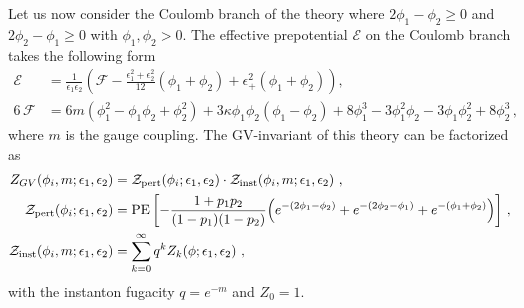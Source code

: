 Let us now consider the Coulomb branch of the theory where $2\phi_1-\phi_2 \ge0$ and $2\phi_2-\phi_1\ge0$ with $\phi_1,\phi_2>0$. The effective prepotential $\mathcal{E}$ on the Coulomb branch takes the following form
\begin{align}\label{eq:SU3_k_prepotential}
\mathcal{E} &= \frac{1}{\epsilon_1 \epsilon_2} 
\left( \mathcal{F} - \frac{\epsilon_1^2  + \epsilon_2^2}{12}(\phi_1 + \phi_2) +\epsilon_+^2 (\phi_1 + \phi_2) \right), \\ 
6\,\mathcal{F} &= 6 m(\phi_1^2 - \phi_1 \phi_2 + \phi_2^2)+ 3\kappa \phi_1 \phi_2(\phi_1 - \phi_2) + 8 \phi_1^3 - 3\phi_1^2 \phi_2 - 3\phi_1 \phi_2^2 + 8\phi_2^3\, ,\nonumber
\end{align}
where $m$ is the gauge coupling. The GV-invariant of this theory can be factorized as
\begin{align}
Z_{GV}(\phi_i, m; \epsilon_1, \epsilon_2) &= \mathcal{Z}_{\mathrm{pert}}(\phi_i; \epsilon_1, \epsilon_2) \cdot \mathcal{Z}_{\mathrm{inst}}(\phi_i, m; \epsilon_1, \epsilon_2) \ , \nonumber  \\
\mathcal{Z}_{\mathrm{pert}}(\phi_i; \epsilon_1, \epsilon_2) &= \operatorname{PE} \qty[-\frac{1+p_1 p_2}{(1-p_1)(1-p_2)} \qty(e^{-(2\phi_1 - \phi_2)} + e^{-(2\phi_2-\phi_1)} + e^{-(\phi_1 + \phi_2)})] \ , \nonumber \\
\mathcal{Z}_{\mathrm{inst}}(\phi_i, m; \epsilon_1, \epsilon_2) &= \sum_{k=0}^{\infty} q^k Z_k(\phi; \epsilon_1, \epsilon_2) \ ,
\label{eq:SU3_k_GV}
\end{align}
with the instanton fugacity $ q = e^{-m} $ and $ Z_0 = 1 $. 

